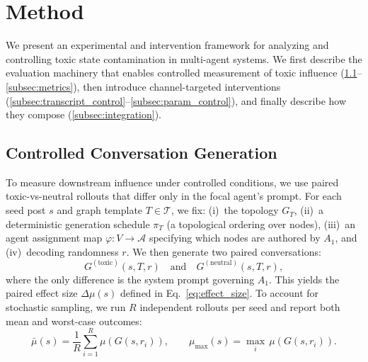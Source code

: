 
\section{Method}
\label{sec:method}

We present an experimental and intervention framework for analyzing and controlling toxic state contamination in multi-agent systems.
We first describe the evaluation machinery that enables controlled measurement of toxic influence (\cref{subsec:controlled_gen}--\cref{subsec:metrics}), then introduce channel-targeted interventions (\cref{subsec:transcript_control}--\cref{subsec:param_control}), and finally describe how they compose (\cref{subsec:integration}).

\subsection{Controlled Conversation Generation}
\label{subsec:controlled_gen}

To measure downstream influence under controlled conditions, we use paired toxic-vs-neutral rollouts that differ only in the focal agent's prompt.
For each seed post $s$ and graph template $T \in \mathcal{T}$, we fix: (i)~the topology $G_T$, (ii)~a deterministic generation schedule $\pi_T$ (a topological ordering over nodes), (iii)~an agent assignment map $\varphi: V \to \mathcal{A}$ specifying which nodes are authored by $A_1$, and (iv)~decoding randomness $r$.
We then generate two paired conversations:
\begin{equation}
    G^{(\text{toxic})}(s, T, r) \quad \text{and} \quad G^{(\text{neutral})}(s, T, r),
    \label{eq:paired}
\end{equation}
where the only difference is the system prompt governing $A_1$.
This yields the paired effect size $\Delta\mu(s)$ defined in Eq.~\eqref{eq:effect_size}.
To account for stochastic sampling, we run $R$ independent rollouts per seed and report both mean and worst-case outcomes:
\begin{equation}
    \bar{\mu}(s) = \frac{1}{R}\sum_{i=1}^{R} \mu(G(s, r_i)), \qquad
    \mu_{\max}(s) = \max_i\, \mu(G(s, r_i)).
    \label{eq:rollout_stats}
\end{equation}

